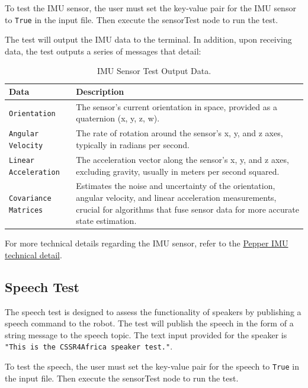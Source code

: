 \documentclass{CSSRforAfrica}
\begin{document}
To test the IMU sensor, the user must set the key-value pair for the IMU sensor to \texttt{True} in the input file. 
Then execute the sensorTest node to run the test.

The test will output the IMU data to the terminal. In addition, upon receiving data, the test outputs a series of messages that detail:


\begin{longtable}[c]{|l|p{10cm}|}
    \caption{IMU Sensor Test Output Data.} \label{tab:imu_sensor_test_output}\\
    \hline
    \rowcolor{gray!30}
    \textbf{Data} & \textbf{Description} \\ \hline
    \endhead %
    \small{\texttt{Orientation}} & \small{The sensor's current orientation in space, provided as a quaternion (x, y, z, w).} \\ \hline
    \small{\texttt{Angular Velocity}} & \small{The rate of rotation around the sensor's x, y, and z axes, typically in radians per second.} \\ \hline
    \small{\texttt{Linear Acceleration}} & \small{The acceleration vector along the sensor's x, y, and z axes, excluding gravity, usually in meters per second squared.} \\ \hline
    \small{\texttt{Covariance Matrices}} & \small{Estimates the noise and uncertainty of the orientation, angular velocity, and linear acceleration measurements, crucial for 
    algorithms that fuse sensor data for more accurate state estimation.} \\ \hline

\end{longtable}

For more technical details regarding the IMU sensor, refer to the \href{http://doc.aldebaran.com/2-5/family/pepper_technical/inertial_pep.html#d-inertial-pepper}{Pepper IMU technical detail}.
\subsection{Speech Test}
The speech test is designed to assess the functionality of speakers by publishing a speech command to the robot. The test will publish the speech in the form of a string message to the speech topic.
The text input provided for the speaker is \texttt{"This is the CSSR4Africa speaker test."}. 

To test the speech, the user must set the key-value pair for the speech to \texttt{True} in the input file. 
Then execute the sensorTest node to run the test.
\end{document}
